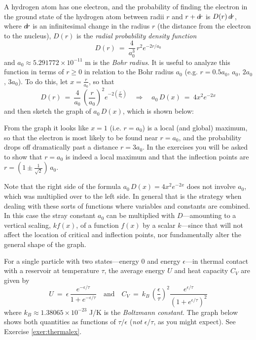 \begin{exmp}\label{exmp:graph5}
\noindent A hydrogen atom has one electron, and the probability of finding the
electron in the ground state of the hydrogen atom between radii $r$ and $r+d\!r$
is $D(r)\,d\!r$, where $d\!r$ is an infinitesimal change in the radius $r$ (the
distance from the electron to the nucleus), $D(r)$ is the \emph{radial
probability density function}
\[
D(r) ~=~ \frac{4}{a_0^3}\,r^2 e^{-2r/a_0}
\]
and $a_0 \approx 5.291772 \times 10^{-11}$ m is the \emph{Bohr radius}. It is useful to analyze this function in terms of $r \ge 0$
in relation to the Bohr radius $a_0$ (e.g.
$r= 0.5a_0$, $a_0$, $2a_0$, $3a_0$). To do this, let $x = \frac{r}{a_0}$, so that
\[
D(r) ~=~ \frac{4}{a_0}\,\left(\frac{r}{a_0}\right)^2 e^{-2\left(\frac{r}{a_0}\right)}
\quad\Rightarrow\quad
a_0\,D(x) ~=~ 4x^2 e^{-2x}
\]
and then sketch the graph of $a_0\,D(x)$, which is shown below:

\begin{center}

\end{center}

\noindent From the graph it looks like $x=1$ (i.e. $r = a_0$) is a local (and
global) maximum, so that the electron is most likely to be found near
$r = a_0$, and the probability drops off dramatically past a distance
$r = 3a_0$. In the exercises you will be asked to show that $r = a_0$ is indeed
a local maximum and that the inflection points are
$r = \left(1 \pm \frac{1}{\sqrt{2}}\right)\,a_0$.\vspace{2mm}

\par\noindent Note that the right side of the formula
$a_0\,D(x) = 4x^2 e^{-2x}$ does not involve $a_0$, which was multiplied
over to the left side. In general that is the strategy when dealing with
these sorts of functions where variables and constants are combined. In this
case the stray constant $a_0$ can be multiplied with $D$---amounting
to a vertical scaling, $kf(x)$, of a function $f(x)$ by a scalar
$k$---since that will not
affect the location of critical and inflection points, nor fundamentally alter
the general shape of the graph.
\end{exmp}
\divider
\newpage
\begin{exmp}\label{exmp:thermalex}
\noindent For a single particle with two states---energy 0 and energy
$\epsilon$---in thermal contact with a reservoir at temperature $\tau$, the
average energy $U$ and heat capacity $C_V$ are given by
\[
U ~=~ \epsilon\,\frac{e^{-\epsilon/\tau}}{1 + e^{-\epsilon/\tau}} \quad\text{and}\quad
C_V ~=~ k_B\,\left(\frac{\epsilon}{\tau}\right)^2 \frac{e^{\epsilon/\tau}}{\left(1 + e^{\epsilon/\tau}\right)^2}
\]
where $k_B \approx 1.38065 \times 10^{\text{$-$}23}$ J/K is the
\emph{Boltzmann constant}. The graph below shows both quantities as functions
of $\tau/\epsilon$ (\emph{not} $\epsilon/\tau$, as you might
expect). See Exercise \ref{exer:thermalex}.\vspace{-3mm}

\begin{center}

\end{center}
\end{exmp}\vspace{-4mm}
